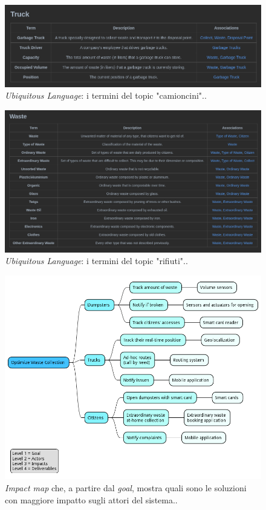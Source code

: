 \begin{figure}[H]
    \centering
    \includegraphics[width=\textwidth]{../img/truck-ubiquitous-language.pm}
    \caption{\textit{Ubiquitous Language}: i termini del topic "camioncini"..}
    \label{fig:truck-ubiquitous-language}
\end{figure}

\begin{figure}[H]
    \centering
    \includegraphics[width=\textwidth]{../img/waste-ubiquitous-language.pm}
    \caption{\textit{Ubiquitous Language}: i termini del topic "rifiuti"..}
    \label{fig:waste-ubiquitous-language}
\end{figure}

\begin{figure}[H]
    \centering
    \includegraphics[width=\textwidth]{../img/impact-mapping.pm}
    \caption{\textit{Impact map} che, a partire dal \textit{goal}, mostra quali sono le soluzioni con maggiore impatto sugli attori del sistema..}
    \label{fig:impact-mapping}
\end{figure}


